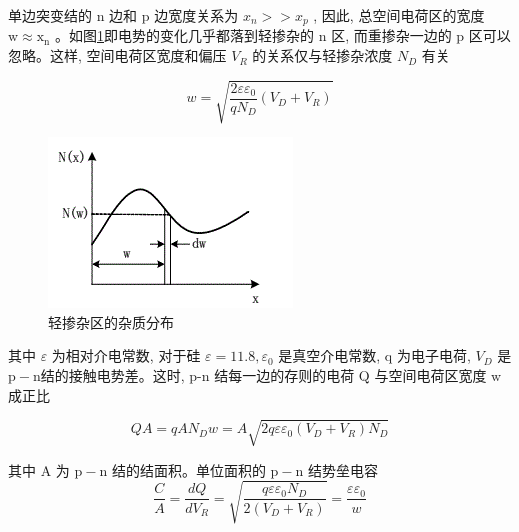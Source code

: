 \documentclass{buaaemp}
\begin{document}
单边突变结的  n  边和  p  边宽度关系为  $x_{n}>>x_{p}$ , 因此, 总空间电荷区的宽度 $ \mathrm{w} \approx \mathrm{x}_{\mathrm{n}}$  。如图\ref{fig:fig1}即电势的变化几乎都落到轻掺杂的 $ \mathrm{n}$  区, 而重掺杂一边的  $\mathrm{p}$  区可以忽略。这样, 空间电荷区宽度和偏压 $ V_{R} $ 的关系仅与轻掺杂浓度  $N_{D}$  有关
\newpage

\begin{equation*}
    w=\sqrt{\frac{2 \varepsilon \varepsilon_{0}}{q N_{D}}\left(V_{D}+V_{R}\right)}
\end{equation*}

\begin{figure}
    \centering
    \includegraphics{image/杂质分布.png}
    \caption{轻掺杂区的杂质分布}
    \label{fig:fig1}
\end{figure}
其中  $\varepsilon$  为相对介电常数, 对于硅 $ \varepsilon=11.8, \varepsilon_{0}$  是真空介电常数,  q  为电子电荷,  $V_{D}$  是  $\mathrm{p}-\mathrm{n}  $结的接触电势差。这时, p-n 结每一边的存则的电荷 $ \mathrm{Q}$  与空间电荷区宽度 $ \mathrm{w}  $成正比

\begin{equation*}
    Q A=q A N_{D} w=A \sqrt{2 q \varepsilon \varepsilon_{0}\left(V_{D}+V_{R}\right) N_{D}}
\end{equation*}

其中  $\mathrm{A}$  为 $ \mathrm{p}-\mathrm{n}$  结的结面积。单位面积的  $\mathrm{p}-\mathrm{n} $ 结势垒电容
\begin{equation*}
    \frac{C}{A}=\frac{d Q}{d V_{R}}=\sqrt{\frac{q \varepsilon \varepsilon_{0} N_{D}}{2\left(V_{D}+V_{R}\right)}}=\frac{\varepsilon \varepsilon_{0}}{w}
\end{equation*}
\end{document}
